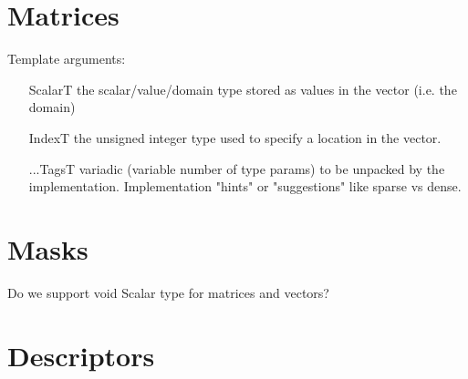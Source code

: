 \section{Matrices}
\label{Sec:Matrices}


Template arguments:
\begin{itemize}[leftmargin=1.1in]
\item[ScalarT]  the scalar/value/domain type stored as values in the vector (i.e. the domain)
\item[IndexT]   the unsigned integer type used to specify a location in the vector.
\item[...TagsT] variadic (variable number of type params) to be unpacked by the implementation.
Implementation "hints" or "suggestions" like sparse vs dense.
\end{itemize}

\section{Masks}
\label{Sec:Masks}

Do we support void Scalar type for matrices and vectors?

\section{Descriptors}
\label{Sec:Descriptors}

